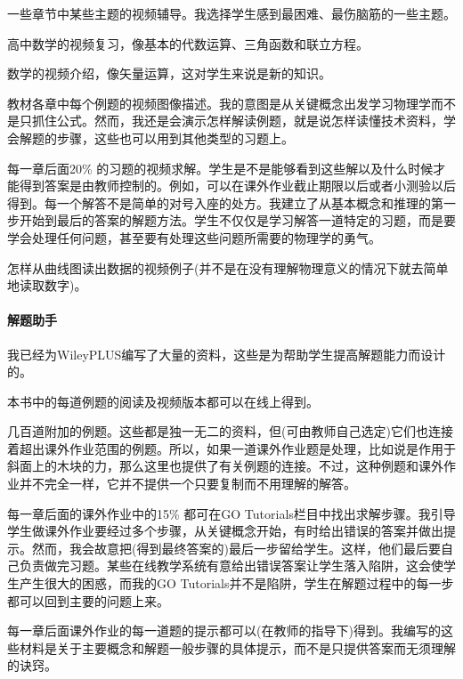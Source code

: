 \begin{UnnumberedItem}
\item 一些章节中某些主题的视频辅导。我选择学生感到最困难、最伤脑筋的一些主题。

\item 高中数学的视频复习，像基本的代数运算、三角函数和联立方程。

\item 数学的视频介绍，像矢量运算，这对学生来说是新的知识。

\item 教材各章中每个例题的视频图像描述。我的意图是从关键概念出发学习物理学而不是只抓住公式。然而，我还是会演示怎样解读例题，就是说怎样读懂技术资料，学会解题的步骤，这些也可以用到其他类型的习题上。

\item 每一章后面20\% 的习题的视频求解。学生是不是能够看到这些解以及什么时候才能得到答案是由教师控制的。例如，可以在课外作业截止期限以后或者小测验以后得到。每一个解答不是简单的对号入座的处方。我建立了从基本概念和推理的第一步开始到最后的答案的解题方法。学生不仅仅是学习解答一道特定的习题，而是要学会处理任何问题，甚至要有处理这些问题所需要的物理学的勇气。

\item 怎样从曲线图读出数据的视频例子(并不是在没有理解物理意义的情况下就去简单地读取数字)。
\end{UnnumberedItem}




\paragraph{解题助手}我已经为WileyPLUS编写了大量的资料，这些是为帮助学生提高解题能力而设计的。

\begin{UnnumberedItem}
\item 本书中的每道例题的阅读及视频版本都可以在线上得到。

\item 几百道附加的例题。这些都是独一无二的资料，但(可由教师自己选定)它们也连接着超出课外作业范围的例题。所以，如果一道课外作业题是处理，比如说是作用于斜面上的木块的力，那么这里也提供了有关例题的连接。不过，这种例题和课外作业并不完全一样，它并不提供一个只要复制而不用理解的解答。

\item 每一章后面的课外作业中的15\% 都可在GO Tutorials栏目中找出求解步骤。我引导学生做课外作业要经过多个步骤，从关键概念开始，有时给出错误的答案并做出提示。然而，我会故意把(得到最终答案的)最后一步留给学生。这样，他们最后要自己负责做完习题。某些在线教学系统有意给出错误答案让学生落入陷阱，这会使学生产生很大的困惑，而我的GO Tutorials并不是陷阱，学生在解题过程中的每一步都可以回到主要的问题上来。

\item 每一章后面课外作业的每一道题的提示都可以(在教师的指导下)得到。我编写的这些材料是关于主要概念和解题一般步骤的具体提示，而不是只提供答案而无须理解的诀窍。
\end{UnnumberedItem}

